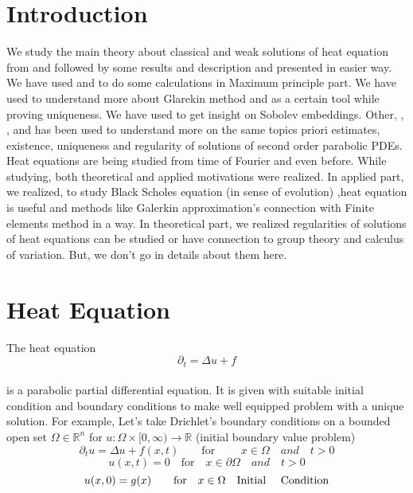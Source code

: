 \section{Introduction}

We study the main theory about classical and weak solutions of heat equation from  \cite{evans} and  \cite{lecture2} followed by some results and description  \cite{ahmed} and \cite{math9} presented in easier way. We have used \cite{stack} and \cite{green} to do some calculations in Maximum principle part. We have used \cite{gron} to understand more about Glarekin method and \cite{gron} as a certain tool  while proving uniqueness. We have used \cite{sobolev} to get insight on Sobolev embeddings. Other, \cite{priori} , \cite{lmu} , \cite{increased} and \cite{youtube} has been used to understand more on the same topics priori estimates, existence, uniqueness and regularity of solutions of second order parabolic PDEs. \\
Heat equations are being studied from time of Fourier and even before. While studying, both theoretical and applied motivations were realized. In applied part, we realized, to study Black Scholes equation (in sense of evolution) ,heat equation is useful and  methods like Galerkin approximation's connection with  Finite elements method in a way. In theoretical part, we realized regularities of solutions of heat equations can be studied or have connection to group theory and calculus of variation. But, we don't go in details about them here.  





















\section{Heat Equation}
The heat equation \\
\begin{equation}
    \partial_{t} = \Delta u + f
\end{equation}\\
is a parabolic partial differential equation. It is given with suitable initial condition and boundary conditions to make well equipped problem with a unique solution. For example, Let's take Drichlet's boundary conditions on a bounded open set $\Omega \in \mathbb{R}^{n}$ for $u: \Omega \times [0, \infty) \rightarrow \mathbb{R}$ \quad (initial boundary value problem)
\begin{equation}
    \partial_{t}u = \Delta u + f(x,t) \qquad \text{for } \qquad x \in \Omega \quad and \quad t>0 \end{equation}
\[u(x,t)=0    \quad \text{for} \quad  x \in \partial \Omega \quad and \quad t>0\]
\[u(x,0)=g(x)  \qquad \text{for} \quad x \in \Omega \quad \text{Initial \quad Condition}\]\\

